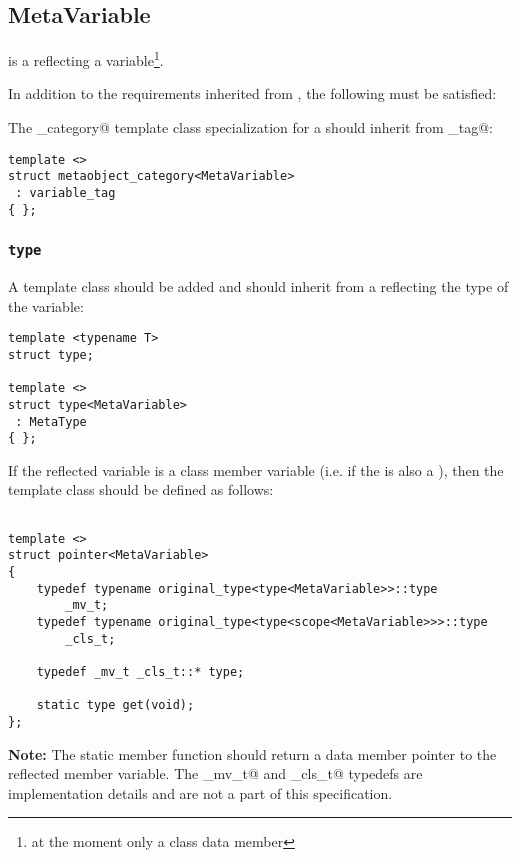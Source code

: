 \subsection{MetaVariable}
\label{concept-MetaVariable}

 is a  reflecting a variable\footnote{
at the moment only a class data member}.

In addition to the requirements inherited from , the following must
be satisfied:

The \verb@metaobject_category@ template class specialization for a  should
inherit from \verb@variable_tag@:

\begin{verbatim}
template <>
struct metaobject_category<MetaVariable>
 : variable_tag
{ };
\end{verbatim}

\subsubsection{\texttt{type}}

A template class \verb@type@ should be added and should inherit
from a  reflecting the type of the variable:

\begin{verbatim}
template <typename T>
struct type;

template <>
struct type<MetaVariable>
 : MetaType
{ };
\end{verbatim}

If the reflected variable is a class member variable (i.e. if the 
is also a ), then the \verb@pointer@ template class should be
defined as follows:

\begin{verbatim}

template <>
struct pointer<MetaVariable>
{
	typedef typename original_type<type<MetaVariable>>::type
		_mv_t;
	typedef typename original_type<type<scope<MetaVariable>>>::type
		_cls_t;

	typedef _mv_t _cls_t::* type;

	static type get(void);
};

\end{verbatim}

\textbf{Note:} The static member function \verb@get@ should return a data member pointer to
the reflected member variable. The \verb@_mv_t@ and \verb@_cls_t@ typedefs
are implementation details and are not a part of this specification.
